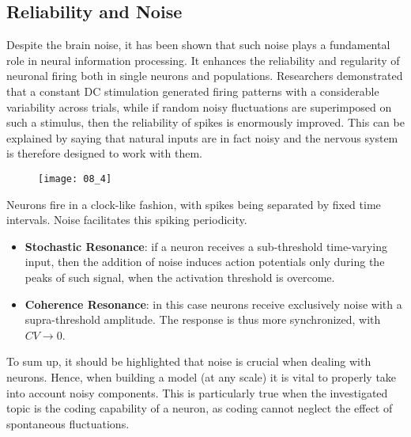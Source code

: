 \subsection{Reliability and Noise}
Despite the brain noise, it has been shown that such noise plays a fundamental role in neural
information processing. It enhances the reliability and regularity of neuronal firing both
in single neurons and populations. Researchers demonstrated that a constant DC stimulation
generated firing patterns with a considerable variability across trials, while if random
noisy fluctuations are superimposed on such a stimulus, then the reliability of spikes
is enormously improved. This can be explained by saying that natural inputs are in fact noisy
and the nervous system is therefore designed to work with them.
\begin{figure}[H]
    \texttt{[image: 08\_4]}
    \centering
\end{figure}
Neurons fire in a clock-like fashion, with spikes being separated by fixed time intervals.
Noise facilitates this spiking periodicity.
\begin{itemize}
    \item \textbf{Stochastic Resonance}: if a neuron receives a sub-threshold time-varying input,
          then the addition of noise induces action potentials only during the peaks of such signal,
          when the activation threshold is overcome.
    \item \textbf{Coherence Resonance}: in this case neurons receive exclusively noise with a
          supra-threshold amplitude. The response is thus more synchronized, with \(CV\to{0}\).
\end{itemize}
To sum up, it should be highlighted that noise is crucial when dealing with neurons. Hence,
when building a model (at any scale) it is vital to properly take into account noisy
components. This is particularly true when the investigated topic is the coding capability of
a neuron, as coding cannot neglect the effect of spontaneous fluctuations.